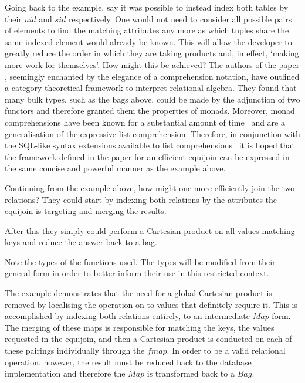 Going back to the example, say it was possible to instead index both tables by their
$uid$ and $sid$ respectively. One would not need to consider all possible pairs
of elements to find the matching attributes any more as which tuples share the
same indexed element would already be known. This will allow the developer to greatly reduce the
order in which they are taking products and, in effect, `making more work for
themselves'. How might this be achieved? The authors of the paper \relalg{},
seemingly enchanted by the elegance of a comprehension notation, have outlined a
category theoretical framework to interpret relational algebra. They found that
many bulk types, such as the bags above, could be made by the adjunction of two
functors and therefore granted them the properties of monads. Moreover, monad
comprehensions have been known for a substantial amount of
time~\cite{MonadComprehensions} and are a generalisation of the expressive list
comprehension. Therefore, in conjunction with the SQL-like syntax extensions
available to list comprehensions~\cite{ComprehensiveComprehensions} it is hoped
that the framework defined in the paper for an efficient equijoin can be
expressed in the same concise and powerful manner as the example above.

Continuing from the example above, how might one more efficiently join the
two relations? They could start by indexing both relations by the attributes the equijoin
is targeting and merging the results.

\begin{center}

\end{center}

\noindent
After this they simply could perform a Cartesian product on all values matching keys
and reduce the answer back to a bag.

\begin{center}

\end{center}

\noindent
Note the types of the functions used. The types will be modified from their general
form in order to better inform their use in this restricted context.



\noindent
The example demonstrates that the need for a global Cartesian product is removed by localising
the operation on to values that definitely require it. This is accomplished by
indexing both relations entirely, to an intermediate $Map$ form. The merging of
these maps is responsible for matching the keys, the values requested in the
equijoin, and then a Cartesian product is conducted on each of these pairings
individually through the $fmap$. In order to be a valid relational operation,
however, the result must be reduced back to the database implementation and
therefore the $Map$ is transformed back to a $Bag$.

